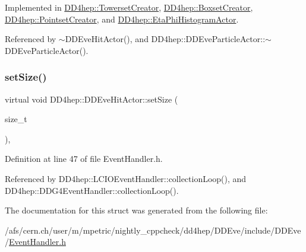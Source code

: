 Implemented in \hyperlink{struct_d_d4hep_1_1_towerset_creator_a5afb1ff94fd502e36e56df19effe7221}{D\+D4hep\+::\+Towerset\+Creator}, \hyperlink{struct_d_d4hep_1_1_boxset_creator_a25f63197d03ad33193ac3c77207db808}{D\+D4hep\+::\+Boxset\+Creator}, \hyperlink{struct_d_d4hep_1_1_pointset_creator_ac17113e2952d438023d2b9d6a31d6e36}{D\+D4hep\+::\+Pointset\+Creator}, and \hyperlink{struct_d_d4hep_1_1_eta_phi_histogram_actor_ae0ab6bd1064a336f7cb3f1592a70e063}{D\+D4hep\+::\+Eta\+Phi\+Histogram\+Actor}.



Referenced by $\sim$\+D\+D\+Eve\+Hit\+Actor(), and D\+D4hep\+::\+D\+D\+Eve\+Particle\+Actor\+::$\sim$\+D\+D\+Eve\+Particle\+Actor().

\hypertarget{struct_d_d4hep_1_1_d_d_eve_hit_actor_afb0005607761c55de470605dd4cc2acd}{}\label{struct_d_d4hep_1_1_d_d_eve_hit_actor_afb0005607761c55de470605dd4cc2acd} 
\subsubsection{\texorpdfstring{set\+Size()}{setSize()}}
{\footnotesize\ttfamily virtual void D\+D4hep\+::\+D\+D\+Eve\+Hit\+Actor\+::set\+Size (\begin{DoxyParamCaption}\item[{size\+\_\+t}]{ }\end{DoxyParamCaption})\hspace{0.3cm}{\ttfamily [inline]}, {\ttfamily [virtual]}}



Definition at line 47 of file Event\+Handler.\+h.



Referenced by D\+D4hep\+::\+L\+C\+I\+O\+Event\+Handler\+::collection\+Loop(), and D\+D4hep\+::\+D\+D\+G4\+Event\+Handler\+::collection\+Loop().



The documentation for this struct was generated from the following file\+:\begin{DoxyCompactItemize}
\item 
/afs/cern.\+ch/user/m/mpetric/nightly\+\_\+cppcheck/dd4hep/\+D\+D\+Eve/include/\+D\+D\+Eve/\hyperlink{_event_handler_8h}{Event\+Handler.\+h}\end{DoxyCompactItemize}
